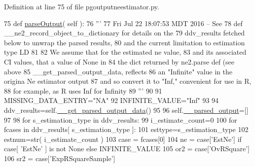 Definition at line 75 of file pgoutputneestimator.\+py.


\begin{DoxyCode}
75     \textcolor{keyword}{def }\hyperlink{classnegui_1_1pgoutputneestimator_1_1PGOutputNeEstimator_a7b6885cf565cb604ab24d7082858f57b}{parseOutput}( self ):
76         \textcolor{stringliteral}{'''}
77 \textcolor{stringliteral}{        Fri Jul 22 18:07:53 MDT 2016 -- See }
78 \textcolor{stringliteral}{        def \_\_ne2\_record\_object\_to\_dictionary for details on the}
79 \textcolor{stringliteral}{        ddv\_results fetched below to unwrap the parsed results,}
80 \textcolor{stringliteral}{        and the current limitation to estimation type LD}
81 \textcolor{stringliteral}{}
82 \textcolor{stringliteral}{        We assume that for the estimated ne value,}
83 \textcolor{stringliteral}{        and its associated CI values, that a value of None in}
84 \textcolor{stringliteral}{        the dict returned by ne2.parse def (see above }
85 \textcolor{stringliteral}{        \_\_get\_parsed\_output\_data, reflects}
86 \textcolor{stringliteral}{        an "Infinite" value in the origina Ne estimator output}
87 \textcolor{stringliteral}{        and so convert it to "Inf,"  convenient for use in R,}
88 \textcolor{stringliteral}{        for example, as R uses Inf for Infinity}
89 \textcolor{stringliteral}{        '''}
90 
91         MISSING\_DATA\_ENTRY=\textcolor{stringliteral}{"NA"}
92         INFINITE\_VALUE=\textcolor{stringliteral}{"Inf"}
93 
94         ddv\_results=self.\hyperlink{classnegui_1_1pgoutputneestimator_1_1PGOutputNeEstimator_a70fbaa3f31f7d7c3ec0fdea15e923680}{\_\_get\_parsed\_output\_data}()
95 
96         self.\hyperlink{classnegui_1_1pgoutputneestimator_1_1PGOutputNeEstimator_a3579f427ddfe05902a6f4e3301704191}{\_\_parsed\_output}=[]
97 
98         \textcolor{keywordflow}{for} s\_estimation\_type \textcolor{keywordflow}{in} ddv\_results:
99             i\_estimate\_count=0
100             \textcolor{keywordflow}{for} fcases \textcolor{keywordflow}{in} ddv\_results[ s\_estimation\_type ]:
101                 esttype=s\_estimation\_type
102                 estnum=str( i\_estimate\_count )
103                 case = fcases[0] 
104                 ne = case[\textcolor{stringliteral}{'EstNe'}]  \textcolor{keywordflow}{if} case[ \textcolor{stringliteral}{'EstNe'} ] \textcolor{keywordflow}{is} \textcolor{keywordflow}{not} \textcolor{keywordtype}{None} \textcolor{keywordflow}{else} INFINITE\_VALUE
105                 or2 = case[\textcolor{stringliteral}{'OvRSquare'}] 
106                 sr2 = case[\textcolor{stringliteral}{'ExpRSquareSample'}] 

\end{DoxyCode}
